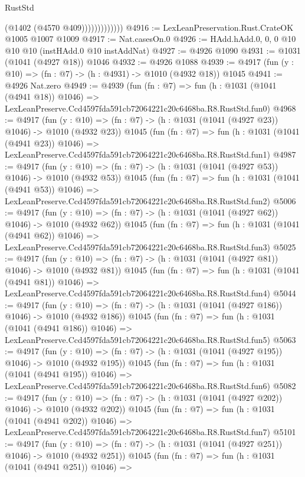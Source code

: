 \begin{lexlean}{RustStd}
\begin{coremodule}
                          (@1402 (@4570 @409)))))))))))))
@4916 := LexLeanPreservation.Rust.CrateOK @1005 @1007 @1009
@4917 := Nat.casesOn.{0}
@4926 := HAdd.hAdd.{0, 0, 0} @10 @10 @10 (instHAdd.{0} @10 instAddNat)
@4927 := @4926 @1090
@4931 := @1031 (@1041 (@4927 @18)) @1046
@4932 := @4926 @1088
@4939 := @4917 (fun (y : @10) => (fn : @7) -> (h : @4931) -> @1010 (@4932 @18)) @1045
@4941 := @4926 Nat.zero
@4949 := @4939
    (fun (fn : @7) =>
    fun (h : @1031 (@1041 (@4941 @18)) @1046) =>
    LexLeanPreserve.Ccd4597fda591cb72064221c20c6468ba.R8.RustStd.fun0)
@4968 := @4917
    (fun (y : @10) => (fn : @7) -> (h : @1031 (@1041 (@4927 @23)) @1046) -> @1010 (@4932 @23))
    @1045
    (fun (fn : @7) =>
    fun (h : @1031 (@1041 (@4941 @23)) @1046) =>
    LexLeanPreserve.Ccd4597fda591cb72064221c20c6468ba.R8.RustStd.fun1)
@4987 := @4917
    (fun (y : @10) => (fn : @7) -> (h : @1031 (@1041 (@4927 @53)) @1046) -> @1010 (@4932 @53))
    @1045
    (fun (fn : @7) =>
    fun (h : @1031 (@1041 (@4941 @53)) @1046) =>
    LexLeanPreserve.Ccd4597fda591cb72064221c20c6468ba.R8.RustStd.fun2)
@5006 := @4917
    (fun (y : @10) => (fn : @7) -> (h : @1031 (@1041 (@4927 @62)) @1046) -> @1010 (@4932 @62))
    @1045
    (fun (fn : @7) =>
    fun (h : @1031 (@1041 (@4941 @62)) @1046) =>
    LexLeanPreserve.Ccd4597fda591cb72064221c20c6468ba.R8.RustStd.fun3)
@5025 := @4917
    (fun (y : @10) => (fn : @7) -> (h : @1031 (@1041 (@4927 @81)) @1046) -> @1010 (@4932 @81))
    @1045
    (fun (fn : @7) =>
    fun (h : @1031 (@1041 (@4941 @81)) @1046) =>
    LexLeanPreserve.Ccd4597fda591cb72064221c20c6468ba.R8.RustStd.fun4)
@5044 := @4917
    (fun (y : @10) => (fn : @7) -> (h : @1031 (@1041 (@4927 @186)) @1046) -> @1010 (@4932 @186))
    @1045
    (fun (fn : @7) =>
    fun (h : @1031 (@1041 (@4941 @186)) @1046) =>
    LexLeanPreserve.Ccd4597fda591cb72064221c20c6468ba.R8.RustStd.fun5)
@5063 := @4917
    (fun (y : @10) => (fn : @7) -> (h : @1031 (@1041 (@4927 @195)) @1046) -> @1010 (@4932 @195))
    @1045
    (fun (fn : @7) =>
    fun (h : @1031 (@1041 (@4941 @195)) @1046) =>
    LexLeanPreserve.Ccd4597fda591cb72064221c20c6468ba.R8.RustStd.fun6)
@5082 := @4917
    (fun (y : @10) => (fn : @7) -> (h : @1031 (@1041 (@4927 @202)) @1046) -> @1010 (@4932 @202))
    @1045
    (fun (fn : @7) =>
    fun (h : @1031 (@1041 (@4941 @202)) @1046) =>
    LexLeanPreserve.Ccd4597fda591cb72064221c20c6468ba.R8.RustStd.fun7)
@5101 := @4917
    (fun (y : @10) => (fn : @7) -> (h : @1031 (@1041 (@4927 @251)) @1046) -> @1010 (@4932 @251))
    @1045
    (fun (fn : @7) =>
    fun (h : @1031 (@1041 (@4941 @251)) @1046) =>

\end{coremodule}
\end{lexlean}
